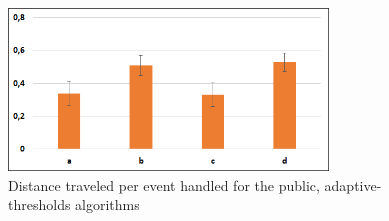 	\begin{figure}[thpb]
      \centering
      \includegraphics[width=8.5cm]{Pictures/PrivAdaptMetric2.png}
      \caption{Distance traveled per event handled for the public, adaptive-thresholds algorithms}
      \label{figure8}
   \end{figure}
